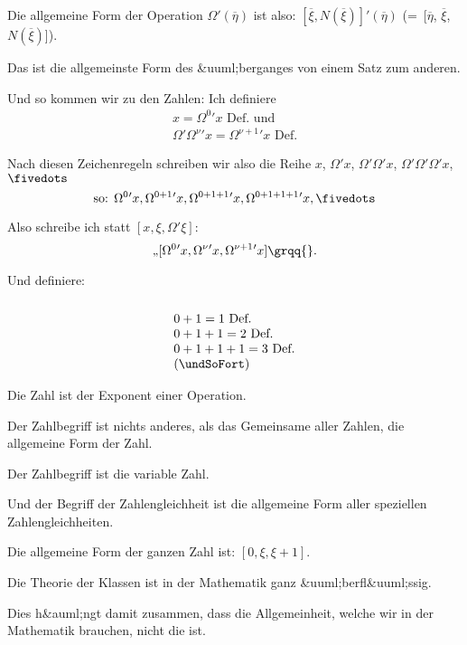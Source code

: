 {Die allgemeine Form der Operation $\Omega'(\overline{\eta})$ ist
also: $[\overline{\xi}, N(\overline{\xi})]'${}$(\overline{\eta})$ (=~[$\overline{\eta}$, $\overline{\xi}$, $N(\overline{\xi})$]).

Das ist die allgemeinste Form des &uuml;berganges
von einem Satz zum anderen.}


{Und so kommen wir zu den Zahlen: Ich definiere
\begin{gather*}
x = \Omega^{0}{}' x \text{ Def.\ und}\\
\Omega'\Omega^{\nu}{}'x = \Omega^{\nu+1}{}'x \text{ Def.}
\end{gather*}

Nach diesen Zeichenregeln schreiben wir also
die Reihe $x$, $\Omega'x$, $\Omega'\Omega'x$, $\Omega'\Omega'\Omega'x$, $\fivedots$
\[
\text{so: }\Omega^{0}{}'x, \Omega^{0+1}{}'x, \Omega^{0+1+1}{}'x, \Omega^{0+1+1+1}{}'x, \fivedots
\]

Also schreibe ich statt \glqq{}$[x, \xi, \Omega'\xi]$\grqq{}:
\[
\text{\quotedblbase} [\Omega^{0}{}'x, \Omega^{\nu}{}'x, \Omega^{\nu+1}{}'x]\text{\grqq{}.}
\]

Und definiere:
\[
\begin{array}{l}\\
0 + 1 = 1\text{ Def.}\\
0 + 1 + 1 = 2\text{ Def.}\\
0 + 1 + 1 + 1 = 3\text{ Def.}\\
\text{(\undSoFort)}
\end{array}
\]
}


{Die Zahl ist der Exponent einer Operation.}


{Der Zahlbegriff ist nichts anderes, als das
Gemeinsame aller Zahlen, die allgemeine Form
der Zahl.

Der Zahlbegriff ist die variable Zahl.

Und der Begriff der Zahlengleichheit ist die
allgemeine Form aller speziellen Zahlengleichheiten.}


{Die allgemeine Form der ganzen Zahl ist:
$[0, \xi, \xi + 1]$.}


{Die Theorie der Klassen ist in der Mathematik
ganz &uuml;berfl&uuml;ssig.

Dies h&auml;ngt damit zusammen, dass die Allgemeinheit,
welche wir in der Mathematik brauchen,
nicht die  ist.}


